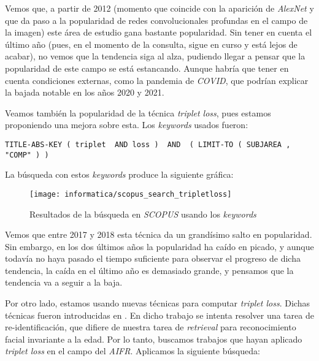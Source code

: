 Vemos que, a partir de 2012 (momento que coincide con la aparición de \textit{AlexNet} y que da paso a la popularidad de redes convolucionales profundas en el campo de la imagen) este área de estudio gana bastante popularidad. Sin tener en cuenta el último año (pues, en el momento de la consulta, sigue en curso y está lejos de acabar), no vemos que la tendencia siga al alza, pudiendo llegar a pensar que la popularidad de este campo se está estancando. Aunque habría que tener en cuenta condiciones externas, como la pandemia de \textit{COVID}, que podrían explicar la bajada notable en los años 2020 y 2021.

Veamos también la popularidad de la técnica \textit{triplet loss}, pues estamos proponiendo una mejora sobre esta. Los \textit{keywords} usados fueron:


\begin{lstlisting}[caption=\textit{Keywords usados para la búsqueda en \textit{SCOPUS} para consultar la popularidad del \textit{triplet loss}}, label=code:scopus_search_tripletloss]
    TITLE-ABS-KEY ( triplet  AND loss )  AND  ( LIMIT-TO ( SUBJAREA ,  "COMP" ) )
\end{lstlisting}

La búsqueda con estos \textit{keywords} produce la siguiente gráfica:

\begin{figure}[H]
    \centering
    \texttt{[image: informatica/scopus\_search\_tripletloss]}
    \caption{Resultados de la búsqueda en \textit{SCOPUS} usando los \textit{keywords} }
\end{figure}

Vemos que entre 2017 y 2018 esta técnica da un grandísimo salto en popularidad. Sin embargo, en los dos últimos años la popularidad ha caído en picado, y aunque todavía no haya pasado el tiempo suficiente para observar el progreso de dicha tendencia, la caída en el último año es demasiado grande, y pensamos que la tendencia va a seguir a la baja.

Por otro lado, estamos usando nuevas técnicas para computar \textit{triplet loss}. Dichas técnicas fueron introducidas en \cite{informatica:principal}. En dicho trabajo se intenta resolver una tarea de re-identificación, que difiere de nuestra tarea de \textit{retrieval} para reconocimiento facial invariante a la edad. Por lo tanto, buscamos trabajos que hayan aplicado \textit{triplet loss} en el campo del \textit{AIFR}. Aplicamos la siguiente búsqueda:

